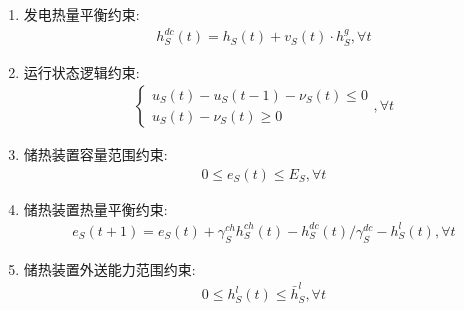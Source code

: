 \documentclass{article}
\begin{document}
\begin{enumerate}
{\begin{enumerate}
{\begin{align}
                    u_{S}(t)\cdot\delta_{S}^{\min}\cdot C_{S}\leq p_{S}(t)\leq u_{S}(t)\cdot\delta_{S}^{\max}\cdot C_{S},\forall t \label{eq:power_range}
                \end{align}
                式(\ref{eq:power_range})线性化后的约束条件为:
                \begin{align}
                    \begin{cases}
                        u_{S}(t)\cdot\delta_{S}^{\min}\cdot C_{S}^{min}\leq p_{S}(t)\leq u_{S}(t)\cdot\delta_{S}^{\max}\cdot C_{S}^{max}\\
                        \delta_{S}^{\min}\cdot C_{S} - M \cdot (1-u_{S}(t)) \leq p_{S}(t)\leq \delta_{S}^{\max}\cdot C_{S}
                    \end{cases},\forall t
                \end{align}
            }
            \item {发电热量平衡约束:
                \begin{align}
                    h_S^{dc}(t)=h_S(t)+v_S(t)\cdot h_S^g,\forall t
                \end{align}
            }
            \item {运行状态逻辑约束:
                \begin{align}
                    \begin{cases}u_S(t)-u_S(t-1)-\nu_S(t)\leq0\\u_S(t)-\nu_S(t)\geq0\end{cases},\forall t
                \end{align}
            }
            \item {储热装置容量范围约束:
                \begin{align}
                    0\leq e_S(t)\leq E_S,\forall t
                \end{align}
            }
            \item {储热装置热量平衡约束:
                \begin{align}
                    e_S(t+1)=e_S(t)+\gamma_S^{ch}h_S^{ch}(t)-h_S^{dc}(t)/\gamma_S^{dc}-h_S^{l}(t),\forall t
                \end{align}
            }
            \item {储热装置外送能力范围约束:
                \begin{align}
                    0\leq h_S^l(t)\leq\bar{h}_S^l,\forall t
                \end{align}
            }
        \end{enumerate}
}
\end{enumerate}
\end{document}
